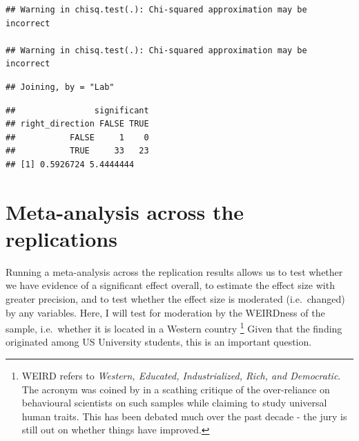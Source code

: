 \documentclass[
]{book}
\newenvironment{Shaded}{\begin{snugshade}}{\end{snugshade}}
\newcommand{\CommentTok}[1]{\textcolor[rgb]{0.56,0.35,0.01}{\textit{#1}}}
\newcommand{\DataTypeTok}[1]{\textcolor[rgb]{0.13,0.29,0.53}{#1}}
\newcommand{\DecValTok}[1]{\textcolor[rgb]{0.00,0.00,0.81}{#1}}
\newcommand{\FloatTok}[1]{\textcolor[rgb]{0.00,0.00,0.81}{#1}}
\newcommand{\KeywordTok}[1]{\textcolor[rgb]{0.13,0.29,0.53}{\textbf{#1}}}
\newcommand{\NormalTok}[1]{#1}
\newcommand{\OperatorTok}[1]{\textcolor[rgb]{0.81,0.36,0.00}{\textbf{#1}}}
\newcommand{\StringTok}[1]{\textcolor[rgb]{0.31,0.60,0.02}{#1}}
\begin{document}
\begin{verbatim}
## Warning in chisq.test(.): Chi-squared approximation may be incorrect

## Warning in chisq.test(.): Chi-squared approximation may be incorrect
\end{verbatim}

\begin{Shaded}
\end{Shaded}

\begin{verbatim}
## Joining, by = "Lab"
\end{verbatim}

\begin{verbatim}
##                significant
## right_direction FALSE TRUE
##           FALSE     1    0
##           TRUE     33   23
## [1] 0.5926724 5.4444444
\end{verbatim}

\hypertarget{meta-analysis-across-the-replications}{%
\section{Meta-analysis across the replications}\label{meta-analysis-across-the-replications}}

Running a meta-analysis across the replication results allows us to test whether we have evidence of a significant effect overall, to estimate the effect size with greater precision, and to test whether the effect size is moderated (i.e.~changed) by any variables. Here, I will test for moderation by the WEIRDness of the sample, i.e.~whether it is located in a Western country \footnote{WEIRD refers to \emph{Western, Educated, Industrialized, Rich, and Democratic}. The acronym was coined by \citet{henrichWeirdestPeopleWorld2010} in a scathing critique of the over-reliance on behavioural scientists on such samples while claiming to study universal human traits. This has been debated much over the past decade - the jury is still out on whether things have improved.}
Given that the finding originated among US University students, this is an important question.
\end{document}
